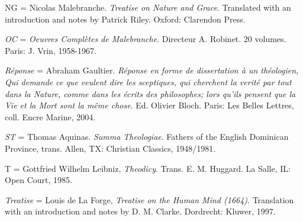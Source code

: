 NG = Nicolas Malebranche. \emph{Treatise on Nature and Grace}.
Translated with an introduction and notes by Patrick Riley. Oxford:
Clarendon Press.

\emph{OC} = \emph{Oeuvres Complètes de Malebranche}. Directeur A.
Robinet. 20 volumes. Paris: J. Vrin, 1958-1967.

\emph{Réponse} = Abraham Gaultier. \emph{Réponse en forme de
	dissertation à un théologien, Qui demande ce que veulent dire les
	sceptiques, qui cherchent la verité par tout dans la Nature, comme dans
	les écrits des philosophes; lors qu'ils pensent que la Vie et la Mort
	sont la même chose}. Ed. Olivier Bloch. Paris: Les Belles Lettres, coll.
Encre Marine, 2004.

\emph{ST} = Thomas Aquinas. \emph{Summa Theologiae}. Fathers of the
English Dominican Province, trans. Allen, TX: Christian Classics,
1948/1981.

T = Gottfried Wilhelm Leibniz, \emph{Theodicy}. Trans. E. M. Huggard. La
Salle, IL: Open Court, 1985.

\emph{Treatise} = Louis de La Forge, \emph{Treatise on the Human Mind
	(1664)}. Translation with an introduction and notes by D. M. Clarke.
Dordrecht: Kluwer, 1997.



%
